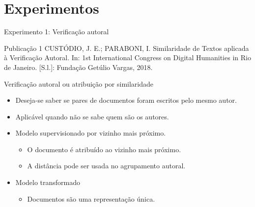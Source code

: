 \section{Experimentos}


\begin{frame}{Experimento 1: Verificação autoral}
\fontsize{3.0mm}{4.0mm}\selectfont
\begin{block}{Publicação 1}
	CUSTÓDIO, J. E.; PARABONI, I. Similaridade de Textos aplicada à Verificação Autoral.
	In: 1st International Congress on Digital Humanities in Rio de Janeiro. [S.l.]: Fundação
	Getúlio Vargas, 2018.
\end{block}

\begin{block}{Verificação autoral ou atribuição por similaridade}
	\begin{itemize}
		\item Deseja-se saber se pares de documentos foram escritos pelo mesmo autor. \cite{Koppel2012}
		\item Aplicável quando não se sabe quem são os autores.
		\item Modelo supervisionado por vizinho mais próximo.
		\begin{itemize}\selectFont
			\item O documento é atribuído ao vizinho mais próximo.
			\item A distância pode ser usada no agrupamento autoral.
		\end{itemize}
		\item Modelo transformado
		\begin{itemize}\selectFont
			\item Documentos são uma representação única.
		\end{itemize}
	\end{itemize}
\end{block}
\end{frame}

